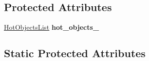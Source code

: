 \subsection*{Protected Attributes}
\begin{DoxyCompactItemize}
\item 
\mbox{\label{classv8_1_1internal_1_1SerializerDeserializer_a0acf7d0187a681e8c2e552b70985537a}} 
\mbox{\hyperlink{classv8_1_1internal_1_1HotObjectsList}{Hot\+Objects\+List}} {\bfseries hot\+\_\+objects\+\_\+}
\end{DoxyCompactItemize}
\subsection*{Static Protected Attributes}
